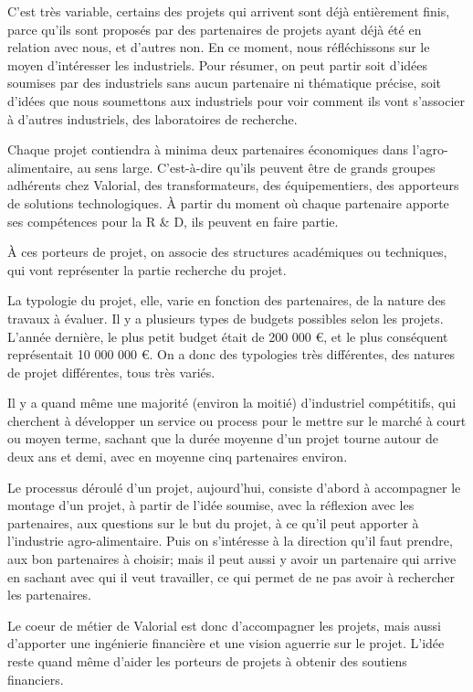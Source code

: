\documentclass[a4paper,12pt]{report}
\begin{document}
	C’est très variable, certains des projets qui arrivent sont déjà entièrement finis, parce qu’ils sont proposés par des partenaires de projets ayant déjà été en relation avec nous, et d’autres non. En ce moment, nous réfléchissons sur le moyen d’intéresser les industriels.
Pour résumer, on peut partir soit d’idées soumises par des industriels sans aucun partenaire ni thématique précise, soit d’idées que nous soumettons aux industriels pour voir comment ils vont s’associer à d’autres industriels, des laboratoires de recherche.

	Chaque projet contiendra à minima deux partenaires économiques dans l'agro-alimentaire, au sens large. C’est-à-dire qu’ils peuvent être de grands groupes adhérents chez Valorial, des transformateurs, des équipementiers, des apporteurs de solutions technologiques. À partir du moment où chaque partenaire apporte ses compétences pour la R \& D, ils peuvent en faire partie.


	À ces porteurs de projet, on associe des structures académiques ou techniques, qui vont représenter la partie recherche du projet.

	La typologie du projet, elle, varie en fonction des partenaires, de la nature des travaux à évaluer. Il y a plusieurs types de budgets possibles selon les projets. L’année dernière, le plus petit budget était de 200 000 €, et le plus conséquent représentait 10 000 000 €. On a donc des typologies très différentes, des natures de projet différentes, tous très variés.

	Il y a quand même une majorité (environ la moitié) d’industriel compétitifs, qui cherchent à développer un service ou process pour le mettre sur le marché à court ou moyen terme, sachant que la durée moyenne d’un projet tourne autour de deux ans et demi, avec en moyenne cinq partenaires environ.

	Le processus déroulé d’un projet, aujourd’hui, consiste d’abord à accompagner le montage d’un projet, à partir de l’idée soumise, avec la réflexion avec les partenaires, aux questions sur le but du projet, à ce qu’il peut apporter à l’industrie agro-alimentaire. Puis on s’intéresse à la direction qu’il faut prendre, aux bon partenaires à choisir; mais il peut aussi y avoir un partenaire qui arrive en sachant avec qui il veut travailler, ce qui permet de ne pas avoir à rechercher les partenaires.

	Le coeur de métier de Valorial est donc d’accompagner les projets, mais aussi d’apporter une ingénierie financière et une vision aguerrie sur le projet. L’idée reste quand même d’aider les porteurs de projets à obtenir des soutiens financiers.
\end{document}
